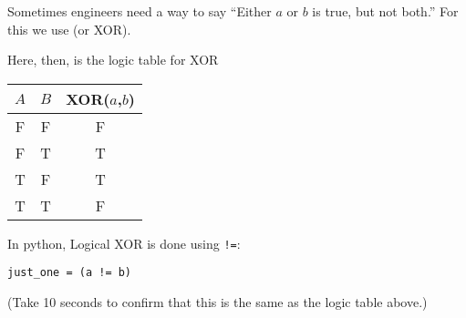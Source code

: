 Sometimes engineers need a way to say ``Either $a$ or $b$ is true, but not
both.''  For this we use  (or XOR).

Here, then, is the logic table for XOR

\begin{tabular}{c | c | c}
  $A$ & $B$ & XOR($a$,$b$) \\
  \hline
  F & F & F \\
  F & T & T \\
  T & F & T \\
  T & T & F \\
\end{tabular}

In python, Logical XOR is done using \texttt{!=}:

\begin{verbatim}
just_one = (a != b)
\end{verbatim}

(Take 10 seconds to confirm that this is the same as the logic table
above.)


